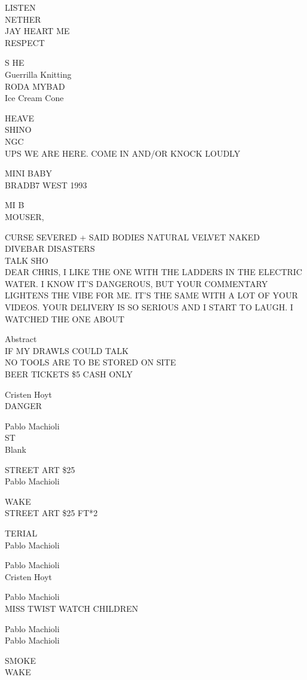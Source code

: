 \documentclass[10pt,letterpaper]{article}
\begin{document}
LISTEN\\
NETHER\\
JAY HEART ME\\
RESPECT

S HE\\
Guerrilla Knitting\\
RODA MYBAD\\
Ice Cream Cone

HEAVE\\
SHINO\\
NGC\\
UPS WE ARE HERE.  COME IN AND/OR KNOCK LOUDLY

MINI BABY\\
BRADB7 WEST 1993

MI B\\
MOUSER,

CURSE SEVERED  + SAID BODIES NATURAL VELVET NAKED\\
DIVEBAR DISASTERS\\
TALK SHO\\
DEAR CHRIS, I LIKE THE ONE WITH THE LADDERS IN THE ELECTRIC WATER.  I KNOW IT'S DANGEROUS, BUT YOUR COMMENTARY LIGHTENS THE VIBE FOR ME.  IT'S THE SAME WITH A LOT OF YOUR VIDEOS.  YOUR DELIVERY IS SO SERIOUS AND I START TO LAUGH.  I WATCHED THE ONE ABOUT

Abstract\\
IF MY DRAWLS COULD TALK\\
NO TOOLS ARE TO BE STORED ON SITE\\
BEER TICKETS \$5 CASH ONLY

Cristen Hoyt\\
DANGER

Pablo Machioli\\
ST\\
Blank

STREET ART \$25\\
Pablo Machioli

WAKE\\
STREET ART \$25 FT*2

TERIAL\\
Pablo Machioli

Pablo Machioli\\
Cristen Hoyt

Pablo Machioli\\
MISS TWIST WATCH CHILDREN

Pablo Machioli\\
Pablo Machioli

SMOKE\\
WAKE
\end{document}
